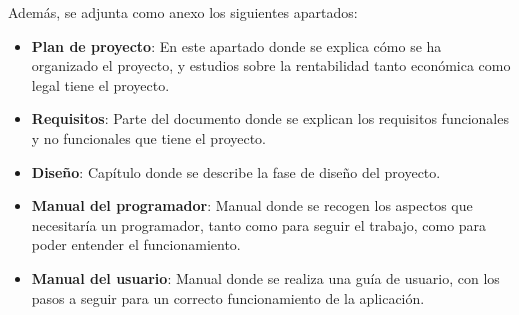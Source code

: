 Además, se adjunta como anexo los siguientes apartados:
\begin{itemize}
    \item \textbf{Plan de proyecto}: En este apartado donde se explica cómo se ha organizado el proyecto, y estudios sobre la rentabilidad tanto económica como legal tiene el proyecto.
    \item \textbf{Requisitos}: Parte del documento donde se explican los requisitos funcionales y no funcionales que tiene el proyecto.
    \item \textbf{Diseño}: Capítulo donde se describe la fase de diseño del proyecto.
    \item \textbf{Manual del programador}: Manual donde se recogen los aspectos que necesitaría un programador, tanto como para seguir el trabajo, como para poder entender el funcionamiento.
    \item \textbf{Manual del usuario}: Manual donde se realiza una guía de usuario, con los pasos a seguir para un correcto funcionamiento de la aplicación.
\end{itemize}
